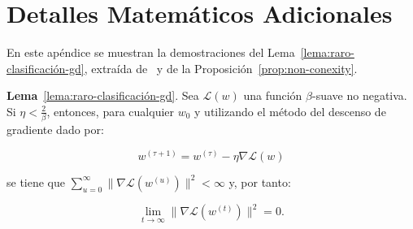 
\chapter{Detalles Matemáticos Adicionales}\label{ap:apendiceA}

En este apéndice se muestran la demostraciones del Lema~\ref{lema:raro-clasificación-gd}, extraída de~\cite{Soudry2024} y de la Proposición~\ref{prop:non-conexity}.\newline

\textbf{Lema}~\ref{lema:raro-clasificación-gd}. Sea $\mathcal{L}(w)$ una función $\beta$-suave no negativa. Si $\eta < \frac{2}{\beta}$, entonces, para cualquier $w_0$ y utilizando el método del descenso de gradiente dado por:

\[
    w^{(\tau + 1)} = w^{(\tau)} - \eta \nabla \mathcal{L}(w)
\]

se tiene que $\sum_{u=0}^{\infty} \| \nabla\mathcal{L}(w^{(u)}) \|^{2} < \infty$ y, por tanto:

\[
    \lim \limits_{t \to \infty} \| \nabla\mathcal{L}(w^{(t)}) \|^{2} = 0.
\]

